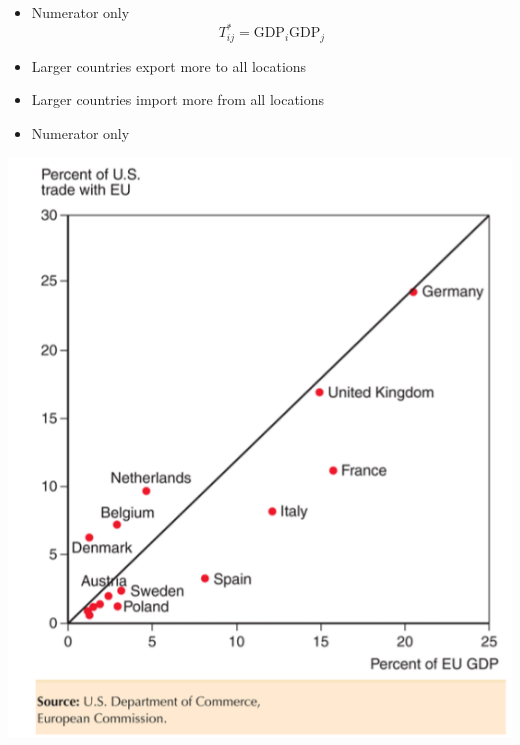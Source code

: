 \documentclass[ignorenonframetext,]{beamer}
\begin{document}
\begin{frame}
   
    \begin{itemize}
        \item Numerator only
        \begin{equation*}
            T^*_{ij} = \mbox{GDP}_i \mbox{GDP}_j
        \end{equation*}
        \item Larger countries export more to all locations
        \item Larger countries import more from all locations
    \end{itemize}

\end{frame}

\begin{frame}
   
    \begin{itemize}
        \item Numerator only
    \end{itemize}
    \includegraphics[scale=0.40]{gravity_numerator_fit.png}

\end{frame}
\end{document}
